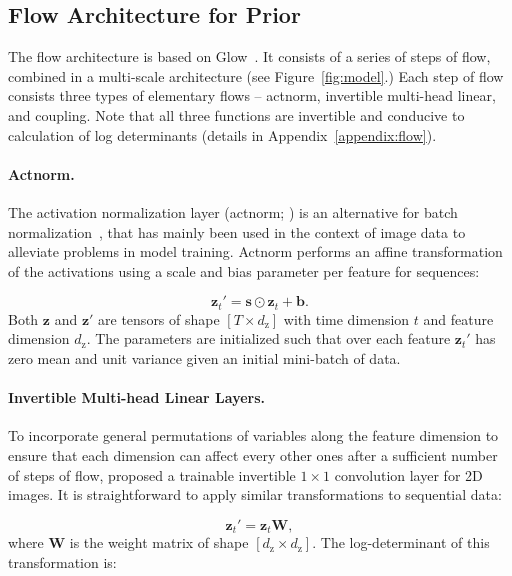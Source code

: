 \documentclass[11pt,a4paper]{article}
\newcommand{\zv}{\mathbf{z}}
\begin{document}
\subsection{Flow Architecture for Prior}
The flow architecture is based on Glow~\citep{kingma2018glow}.
It consists of a series of steps of flow, combined in a multi-scale architecture (see Figure~\ref{fig:model}.)
Each step of flow consists three types of elementary flows -- actnorm, invertible multi-head linear, and coupling.
Note that all three functions are invertible and conducive to calculation of log determinants (details in Appendix~\ref{appendix:flow}).

\paragraph{Actnorm.} The activation normalization layer (actnorm; \citet{kingma2018glow}) is an alternative for batch normalization~\citep{ioffe2015batch}, that has mainly been used in the context of image data to alleviate problems in model training. 
Actnorm performs an affine transformation of the activations using a scale and bias parameter per feature for sequences:

{\small
\begin{equation}\label{eq:actnorm}
\zv_{t}' = \mathbf{s} \odot \zv_{t} + \mathbf{b}.
\end{equation}
}
Both $\zv$ and $\zv'$ are tensors of shape $[T\times d_{\mathrm{z}}]$ with time dimension $t$ and feature dimension $d_{\mathrm{z}}$.
The parameters are initialized such that over each feature $\zv_{t}'$ has zero mean and unit variance given an initial mini-batch of data. 

\paragraph{Invertible Multi-head Linear Layers.}
To incorporate general permutations of variables along the feature dimension to ensure that each dimension can affect every other ones after a sufficient number of steps of flow, \citet{kingma2018glow} proposed a trainable invertible $1\times1$ convolution layer for 2D images.
It is straightforward to apply similar transformations to sequential data:

\vspace{-1mm}
{\small
\begin{equation}\label{eq:linear}
\zv_{t}' = \zv_{t} \mathbf{W},
\end{equation}
}
where $\mathbf{W}$ is the weight matrix of shape $[d_{\mathrm{z}} \times d_{\mathrm{z}}]$.
The log-determinant of this transformation is:
\end{document}
